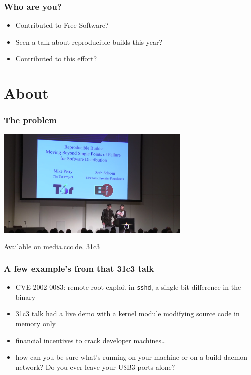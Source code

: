 \documentclass[14pt]{beamer}
\begin{document}
\begin{frame}
 \frametitle{Who are you?}
 \begin{itemize}
  \item Contributed to Free Software?
  \item<2-3> Seen a talk about reproducible builds this year?
  \item<3> Contributed to this effort?
 \end{itemize}
\end{frame}

\section{About}

\begin{frame}
 \frametitle{The problem}

 \begin{center}
  \includegraphics[width=0.7\textwidth]{images/31c3.png}

  Available on \url{media.ccc.de}, 31c3
 \end{center}
\end{frame}

\begin{frame}[fragile]
 \frametitle{A few example's from that 31c3 talk}
 \begin{itemize}
  \item CVE-2002-0083: remote root exploit in \texttt{sshd}, a single bit difference in the binary
  \item 31c3 talk had a live demo with a kernel module modifying source code in memory only
  \item financial incentives to crack developer machines…
  \item how can you be sure what's running on your machine or on a build
  daemon network? Do you ever leave your USB3 ports alone?
 \end{itemize}
\end{frame}
\end{document}

